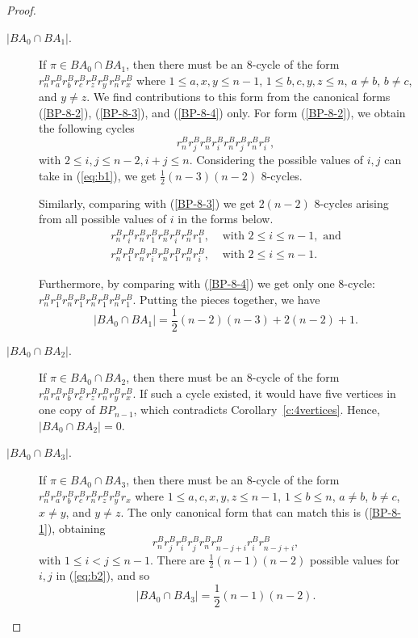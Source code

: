 \documentclass[final]{dmtcs-episciences}
\numberwithin{equation}{section}
\begin{document}
\begin{proof}
\begin{description}
\item[$|BA_0 \cap BA_1|$.] If $\pi \in BA_0 \cap BA_1$, then there must be an 8-cycle of the form $r^B_n r^B_a r^B_b r^B_c r^B_z r^B_y r^B_n r^B_x$ where $1 \leq a,x,y \leq n-1$, $1 \leq b,c,y,z \leq n$, $a \neq b$, $b \neq c$, and $y \neq z$. We find contributions to this form from the canonical forms (\ref{BP-8-2}), (\ref{BP-8-3}), and (\ref{BP-8-4}) only. For form (\ref{BP-8-2}), we obtain the following cycles
\begin{equation}\label{eq:b1}
  r^B_{n}r^B_{j}r^B_{n}r^B_{i}r^B_{n}r^B_{j}r^B_{n}r^B_{i},
\end{equation} with $2 \leq i,j \leq n-2, i+j \leq n$. Considering the possible values of $i,j$ can take in (\ref{eq:b1}), we get $\frac{1}{2}(n-3)(n-2)$ 8-cycles.

Similarly, comparing with (\ref{BP-8-3}) we get $2(n-2)$ 8-cycles arising from all possible values of $i$ in the forms below.
\begin{align*}
    r^B_n r^B_i r^B_n r^B_1 r^B_n r^B_i r^B_n r^B_1, &\text{ with }2 \leq i \leq n-1, \text{ and}\\
    r^B_n r^B_1 r^B_n r^B_i r^B_n r^B_1 r^B_n r^B_i, &\text{ with }2 \leq i \leq n-1.
\end{align*}

Furthermore, by comparing with (\ref{BP-8-4}) we get only one 8-cycle: $r^B_n r^B_1 r^B_n r^B_1 r^B_n r^B_1 r^B_n r^B_1 $. Putting the pieces together, we have 
\begin{displaymath}|BA_0 \cap BA_1| = \frac{1}{2}(n-2)(n-3)+2(n-2)+1.\end{displaymath}

\item[$|BA_0 \cap BA_2|$.] If $\pi \in BA_0 \cap BA_2$, then there must be an 8-cycle of the form $r^B_n r^B_a r^B_b r^B_c r^B_z r^B_n r^B_y r^B_x$. If such a cycle existed, it would have five vertices in one copy of $BP_{n-1}$, which contradicts Corollary~\ref{c:4vertices}. Hence, $|BA_0 \cap BA_2|=0$.

\item[$|BA_0 \cap BA_3|$.] If $\pi \in BA_0 \cap BA_3$, then there must be an 8-cycle of the form $r^B_n r^B_a r^B_b r^B_c r^B_n r^B_z r^B_y r_x$ where $1 \leq a,c,x,y,z \leq n-1$, $1 \leq b \leq n$, $a \neq b$, $b \neq c$, $x \neq y$, and $y \neq z$. The only canonical form that can
match this is (\ref{BP-8-1}), obtaining 
\begin{equation}\label{eq:b2}
r^B_{n}r^B_{j}r^B_{i}r^B_{j}r^B_{n}r^B_{n-j+i}r^B_{i}r^B_{n-j+i},
\end{equation}
with $1\leq i<j \leq n-1$. There are $\frac{1}{2}(n-1)(n-2)$ possible values for $i,j$ in (\ref{eq:b2}), and so \begin{displaymath}|BA_0 \cap BA_3| = \frac{1}{2}(n-1)(n-2).\end{displaymath}


\end{description}
\end{proof}
\end{document}
